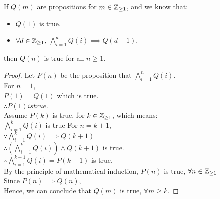\documentclass[a4paper]{article}
\begin{document}
\begin{thm}
If $Q(m)$ are propositions for $m \in \mathbb{Z}_{\geq 1}$, and we know that:
\begin{itemize}
	\item $Q(1)$ is true.
	\item $\forall d \in \mathbb{Z}_{\geq 1}$, $\bigwedge^{d}_{i = 1}Q(i) \implies Q(d+1)$.
\end{itemize}
then $Q(n)$ is true for all $n \geq 1$.
\end{thm}
\begin{proof}
Let $P(n)$ be the proposition that $\bigwedge^{n}_{i = 1}Q(i)$.\\
For $n=1$,\\
$P(1) = Q(1)$ which is true.\\
$\therefore P(1) is true$.\\
Assume $P(k)$ is true, for $k \in \mathbb{Z}_{\geq 1}$, which means:\\
$\bigwedge^{k}_{i = 1}Q(i)$ is true
For $n = k+1$,\\
$\because \bigwedge^{k}_{i = 1}Q(i) \implies Q(k+1)$\\
$\therefore (\bigwedge^{k}_{i = 1}Q(i)) \land Q(k+1)$ is true.\\
$\therefore \bigwedge^{k+1}_{i = 1}Q(i) = P(k+1)$ is true.\\
By the principle of mathematical induction, $P(n)$ is true, $\forall n \in \mathbb{Z}_{\geq 1}$\\
Since $P(n) \implies Q(n)$,\\
Hence, we can conclude that $Q(m)$ is true, $\forall m \geq k$.
\end{proof}
\end{document}
